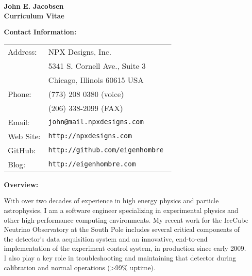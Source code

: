 

\addtolength{\textheight}{1.5in}
\setlength{\voffset}{-0.5in}
\addtolength{\textwidth}{1in}
\setlength{\hoffset}{-0.5in}

\pagestyle{empty}
\parindent=0.0cm
\parskip=0.25cm

\newcommand{\etal}{{\it et.~al.}}
\newcommand{\remember}[1]{{\bf Remember: \{#1\}}}




\begin{center} 
{\Large\bf John E. Jacobsen}\\[0.3cm]
{\bf\Large Curriculum Vitae}
\end{center}
\vspace{1.0cm}


{\bf Contact Information:}

\begin{center}
\begin{tabular}[t]{ll}

Address:   & NPX Designs, Inc. \\
	   & 5341 S. Cornell Ave., Suite 3 \\
	   & Chicago, Illinois 60615 USA\\[0.25cm]

Phone: & (773) 208 0380 (voice) \\
       & (206) 338-2099 (FAX)\\[0.25cm]

Email: & {\tt john@mail.npxdesigns.com}\\
Web Site: & {\tt http://npxdesigns.com }\\
GitHub: & {\tt http://github.com/eigenhombre }\\
Blog: & {\tt http://eigenhombre.com }

\end{tabular}
\end{center}

\vspace{0.5cm}

{\bf Overview:}

With over two decades of experience in high energy physics and particle astrophysics, I am a software engineer specializing in experimental physics and other high-performance computing environments.  My recent work for the IceCube Neutrino Observatory at the South Pole includes several critical components of the detector's data acquisition system and an innovative, end-to-end implementation of the experiment control system, in production since early 2009.  I also play a key role in troubleshooting and maintaining that detector during calibration and normal operations (\textgreater 99\% uptime).

